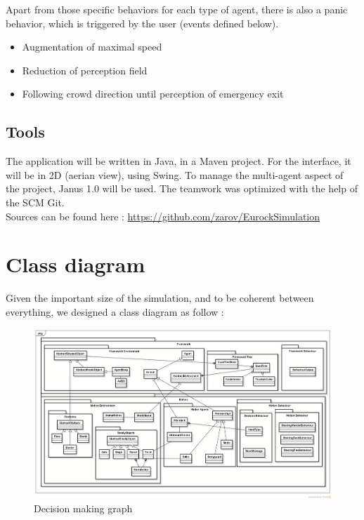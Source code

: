 Apart from those specific behaviors for each type of agent, there is also
a panic behavior, which is triggered by the user (events defined
below).

\begin{itemize}
	\item Augmentation of maximal speed
	\item Reduction of perception field
	\item Following crowd direction until perception of emergency exit
\end{itemize}


\subsection{Tools}

The application will be written in Java, in a Maven project. For the interface,
it will be in 2D (aerian view), using Swing. To manage the multi-agent aspect of
the project, Janus 1.0 will be used. The teamwork was optimized with the help of 
the SCM Git.\\

Sources can be found here :
\href{https://github.com/zarov/EurockSimulation}{https://github.com/zarov/EurockSimulation}

\section{Class diagram}

Given the important size of the simulation, and to be coherent between everything, we designed a class diagram as follow :

\newpage

\begin{figure}[h]
	\begin{center}
		\includegraphics[width=0.72\textheight, angle=90]{img/classdiagram.png}
	\end{center}
	\caption{Decision making graph}
\end{figure}

